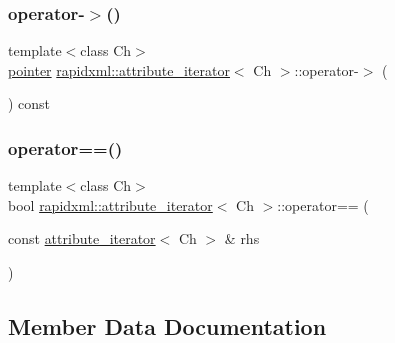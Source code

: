 \subsubsection{\texorpdfstring{operator-\/$>$()}{operator->()}}
{\footnotesize\ttfamily template$<$class Ch$>$ \\
\mbox{\hyperlink{classrapidxml_1_1attribute__iterator_a69acc2e60270d6a062c03c9cb1cf2aa7}{pointer}} \mbox{\hyperlink{classrapidxml_1_1attribute__iterator}{rapidxml\+::attribute\+\_\+iterator}}$<$ Ch $>$\+::operator-\/$>$ (\begin{DoxyParamCaption}{ }\end{DoxyParamCaption}) const\hspace{0.3cm}{\ttfamily [inline]}}

\mbox{\label{classrapidxml_1_1attribute__iterator_ab1dc8dd11d21e145a4e3f76d46aead0d}} 
\subsubsection{\texorpdfstring{operator==()}{operator==()}}
{\footnotesize\ttfamily template$<$class Ch$>$ \\
bool \mbox{\hyperlink{classrapidxml_1_1attribute__iterator}{rapidxml\+::attribute\+\_\+iterator}}$<$ Ch $>$\+::operator== (\begin{DoxyParamCaption}\item[{const \mbox{\hyperlink{classrapidxml_1_1attribute__iterator}{attribute\+\_\+iterator}}$<$ Ch $>$ \&}]{rhs }\end{DoxyParamCaption})\hspace{0.3cm}{\ttfamily [inline]}}



\subsection{Member Data Documentation}
\mbox{\label{classrapidxml_1_1attribute__iterator_a2b4de1b0d86015beeae10e9997438c7a}} 

